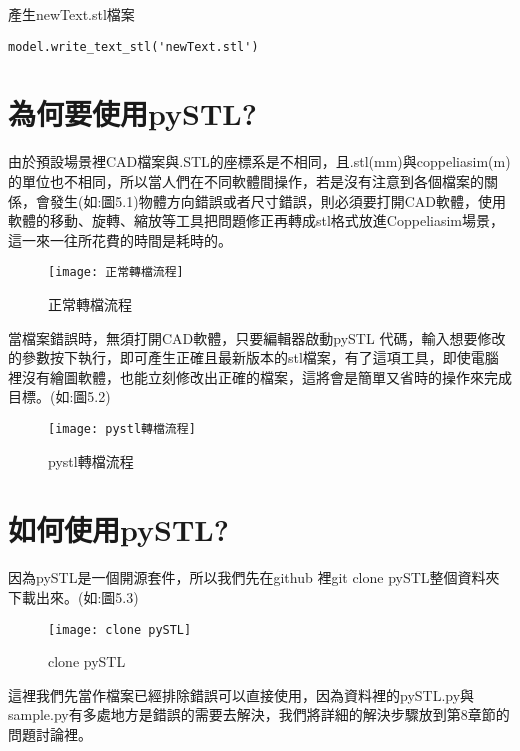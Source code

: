 \item 產生newText.stl檔案
 \begin{lstlisting}[caption=\Large 產生新stl檔案]
model.write_text_stl('newText.stl')
\end{lstlisting}

\section{為何要使用pySTL?}

由於預設場景裡CAD檔案與.STL的座標系是不相同，且.stl(mm)與coppeliasim(m) 的單位也不相同，所以當人們在不同軟體間操作，若是沒有注意到各個檔案的關係，會發生(如:圖5.1)物體方向錯誤或者尺寸錯誤，則必須要打開CAD軟體，使用軟體的移動、旋轉、縮放等工具把問題修正再轉成stl格式放進Coppeliasim場景，這一來一往所花費的時間是耗時的。\\

\begin{figure}[hbt!]
\begin{center}
\texttt{[image: 正常轉檔流程]}
\caption{\Large 正常轉檔流程}\label{正常轉檔流程}
\end{center}
\end{figure}

當檔案錯誤時，無須打開CAD軟體，只要編輯器啟動pySTL 代碼，輸入想要修改的參數按下執行，即可產生正確且最新版本的stl檔案，有了這項工具，即使電腦裡沒有繪圖軟體，也能立刻修改出正確的檔案，這將會是簡單又省時的操作來完成目標。(如:圖5.2)\\

\begin{figure}[hbt!]
\begin{center}
\texttt{[image: pystl轉檔流程]}
\caption{\Large pystl轉檔流程}\label{pystl轉檔流程}
\end{center}
\end{figure}

\section{如何使用pySTL?}
因為pySTL是一個開源套件，所以我們先在github 裡git clone pySTL整個資料夾下載出來。(如:圖5.3)
\begin{figure}[hbt!]
\begin{center}
\texttt{[image: clone pySTL]}
\caption{\Large clone pySTL}\label{clone pySTL}
\end{center}
\end{figure}

這裡我們先當作檔案已經排除錯誤可以直接使用，因為資料裡的pySTL.py與sample.py有多處地方是錯誤的需要去解決，我們將詳細的解決步驟放到第8章節的問題討論裡。\\

